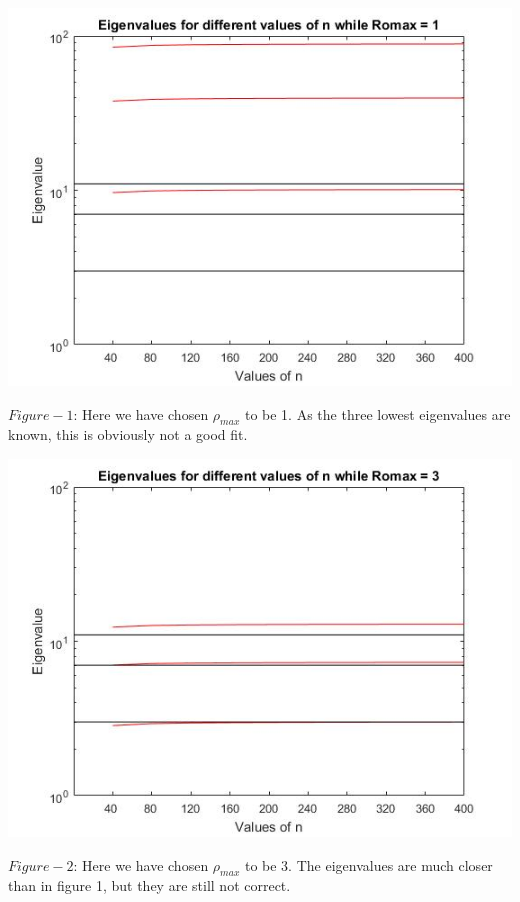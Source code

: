 \documentclass[10pt,a4paper]{article}
\begin{document}
\begin{center}
\includegraphics[scale=0.65]{rho1.jpg}

$Figure-1$: Here we have chosen ${\rho}_{max}$ to be 1. As the three lowest eigenvalues are known, this is obviously not a good fit.   



\includegraphics[scale=0.55]{rho3.jpg}

$Figure-2$: Here we have chosen ${\rho}_{max}$ to be 3. The eigenvalues are much closer than in figure 1, but they are still not correct. 



\end{center}
\end{document}
